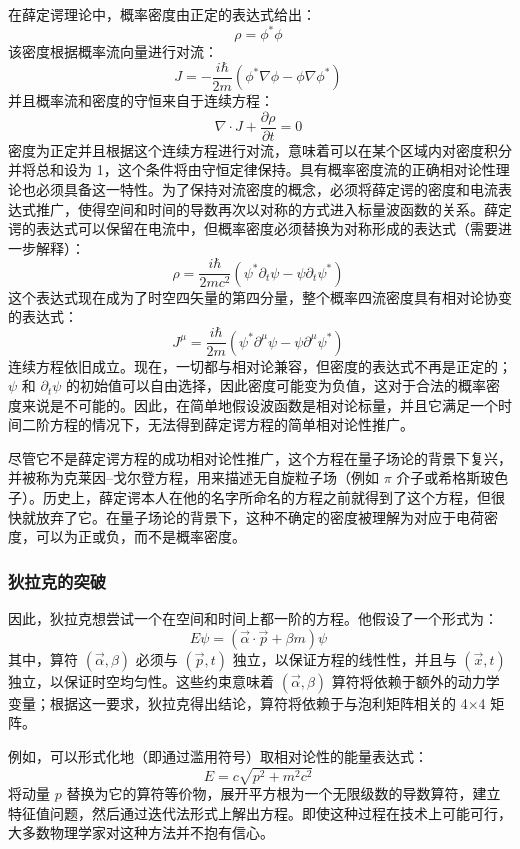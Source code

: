 在薛定谔理论中，概率密度由正定的表达式给出：
\[
\rho = \phi^* \phi~
\]
该密度根据概率流向量进行对流：
\[
J = - \frac{i \hbar}{2m} (\phi^* \nabla \phi - \phi \nabla \phi^*)~
\]
并且概率流和密度的守恒来自于连续方程：
\[
\nabla \cdot J + \frac{\partial \rho}{\partial t} = 0~
\]
密度为正定并且根据这个连续方程进行对流，意味着可以在某个区域内对密度积分并将总和设为 1，这个条件将由守恒定律保持。具有概率密度流的正确相对论性理论也必须具备这一特性。为了保持对流密度的概念，必须将薛定谔的密度和电流表达式推广，使得空间和时间的导数再次以对称的方式进入标量波函数的关系。薛定谔的表达式可以保留在电流中，但概率密度必须替换为对称形成的表达式（需要进一步解释）：
\[
\rho = \frac{i \hbar}{2m c^2} \left( \psi^* \partial_t \psi - \psi \partial_t \psi^* \right)~
\]
这个表达式现在成为了时空四矢量的第四分量，整个概率四流密度具有相对论协变的表达式：
\[
J^\mu = \frac{i \hbar}{2m} \left( \psi^* \partial^\mu \psi - \psi \partial^\mu \psi^* \right)~
\]
连续方程依旧成立。现在，一切都与相对论兼容，但密度的表达式不再是正定的；\(\psi\) 和 \(\partial_t \psi\) 的初始值可以自由选择，因此密度可能变为负值，这对于合法的概率密度来说是不可能的。因此，在简单地假设波函数是相对论标量，并且它满足一个时间二阶方程的情况下，无法得到薛定谔方程的简单相对论性推广。

尽管它不是薛定谔方程的成功相对论性推广，这个方程在量子场论的背景下复兴，并被称为克莱因–戈尔登方程，用来描述无自旋粒子场（例如 \(\pi\) 介子或希格斯玻色子）。历史上，薛定谔本人在他的名字所命名的方程之前就得到了这个方程，但很快就放弃了它。在量子场论的背景下，这种不确定的密度被理解为对应于电荷密度，可以为正或负，而不是概率密度。
\subsubsection{狄拉克的突破}
因此，狄拉克想尝试一个在空间和时间上都一阶的方程。他假设了一个形式为：
\[
E\psi = (\vec{\alpha} \cdot \vec{p} + \beta m) \psi~
\]
其中，算符 \((\vec{\alpha}, \beta)\) 必须与 \((\vec{p}, t)\) 独立，以保证方程的线性性，并且与 \((\vec{x}, t)\) 独立，以保证时空均匀性。这些约束意味着 \((\vec{\alpha}, \beta)\) 算符将依赖于额外的动力学变量；根据这一要求，狄拉克得出结论，算符将依赖于与泡利矩阵相关的 4×4 矩阵。

例如，可以形式化地（即通过滥用符号）取相对论性的能量表达式：
\[
E = c \sqrt{p^2 + m^2 c^2}~
\]
将动量 \(p\) 替换为它的算符等价物，展开平方根为一个无限级数的导数算符，建立特征值问题，然后通过迭代法形式上解出方程。即使这种过程在技术上可能可行，大多数物理学家对这种方法并不抱有信心。

